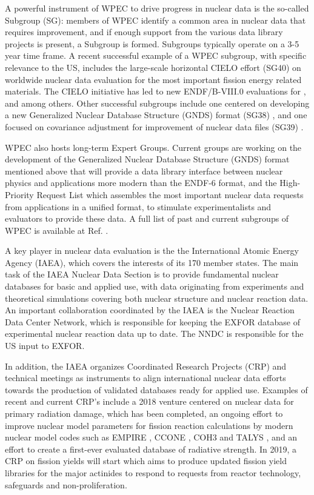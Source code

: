 \documentclass[letterpaper]{ar-1col}
\begin{document}
A powerful instrument of WPEC to drive progress in nuclear data is the so-called Subgroup (SG): members of WPEC identify a common area in nuclear data that requires improvement, and if enough support from the various data library projects is present, a Subgroup is formed.
 Subgroups typically operate on a 3-5 year time frame.
A recent successful example of a WPEC subgroup, with specific relevance to the US, includes the large-scale horizontal CIELO effort (SG40) on worldwide nuclear data evaluation for the most important fission energy related materials.
The CIELO initiative has led to new ENDF/B-VIII.0 evaluations for ,  and  among others.  Other successful subgroups include one centered on developing a new Generalized Nuclear Database Structure (GNDS) format (SG38) \cite{SG38}, and one focused  on covariance adjustment for improvement of nuclear data files (SG39) \cite{SG39}.

WPEC also hosts long-term Expert Groups.  Current groups are working on the development of the Generalized Nuclear Database Structure (GNDS) format mentioned above that will provide a data library interface between nuclear physics and applications more modern than the ENDF-6 format, and the High-Priority Request List which assembles the most important nuclear data requests from applications in a unified format, to stimulate experimentalists and evaluators to provide these data.  A full list of past and current subgroups of WPEC is available at Ref. \cite{WPEC}.
 
A key player in nuclear data evaluation is the the International Atomic Energy Agency (IAEA), which covers the interests of its 170 member states.
The main task of the IAEA Nuclear Data Section is to provide fundamental nuclear databases for basic and applied use, with data originating from experiments and theoretical simulations covering both nuclear structure and nuclear reaction data.
 An important collaboration coordinated by the IAEA is the Nuclear Reaction Data Center Network, which is responsible for keeping the EXFOR database of experimental nuclear reaction data up to date. The NNDC is responsible for the US input to EXFOR.
 
In addition, the IAEA organizes Coordinated Research Projects (CRP) and technical meetings as instruments to align international nuclear data efforts towards the production of validated databases ready for applied use.
 Examples of recent and current CRP's include a 2018 venture centered on nuclear data for primary radiation damage, which has been completed, an ongoing effort to improve nuclear model parameters for fission reaction calculations by modern nuclear model codes such as EMPIRE \cite{Herman2007}, CCONE \cite{Iwa16}, COH3 \cite{KAWANO2010} and TALYS \cite{Koning2012}, and an effort to create a first-ever evaluated database of radiative strength.
 In 2019, a CRP on fission yields will start which aims to produce updated fission yield libraries for the major actinides to respond to requests from reactor technology, safeguards and non-proliferation.
\end{document}
